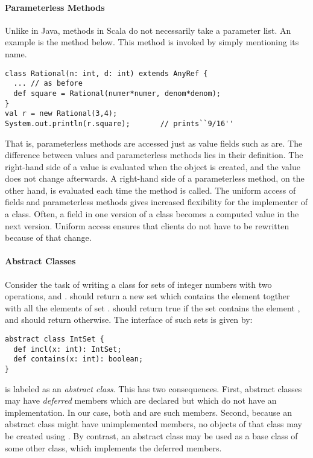 \documentclass[a4paper,12pt,twoside,titlepage]{book}
\begin{document}
\paragraph{Parameterless Methods}
Unlike in Java, methods in Scala do not necessarily take a
parameter list. An example is the  method below. This
method is invoked by simply mentioning its name. 
\begin{lstlisting}
class Rational(n: int, d: int) extends AnyRef {
  ... // as before
  def square = Rational(numer*numer, denom*denom);
}
val r = new Rational(3,4);
System.out.println(r.square);		// prints``9/16''
\end{lstlisting}
That is, parameterless methods are accessed just as value fields such
as  are. The difference between values and parameterless
methods lies in their definition. The right-hand side of a value is
evaluated when the object is created, and the value does not change
afterwards. A right-hand side of a parameterless method, on the other
hand, is evaluated each time the method is called.  The uniform access
of fields and parameterless methods gives increased flexibility for
the implementer of a class. Often, a field in one version of a class
becomes a computed value in the next version. Uniform access ensures
that clients do not have to be rewritten because of that change.

\paragraph{Abstract Classes}

Consider the task of writing a class for sets of integer numbers with
two operations,  and . 
should return a new set which contains the element  togther
with all the elements of set .  should
return true if the set  contains the element , and
should return  otherwise. The interface of such sets is
given by:  
\begin{lstlisting}
abstract class IntSet {
  def incl(x: int): IntSet;
  def contains(x: int): boolean;
}
\end{lstlisting}
 is labeled as an \emph{abstract class}. This has two
consequences.  First, abstract classes may have {\em deferred} members
which are declared but which do not have an implementation. In our
case, both  and  are such members. Second,
because an abstract class might have unimplemented members, no objects
of that class may be created using . By contrast, an
abstract class may be used as a base class of some other class, which
implements the deferred members.
\end{document}
